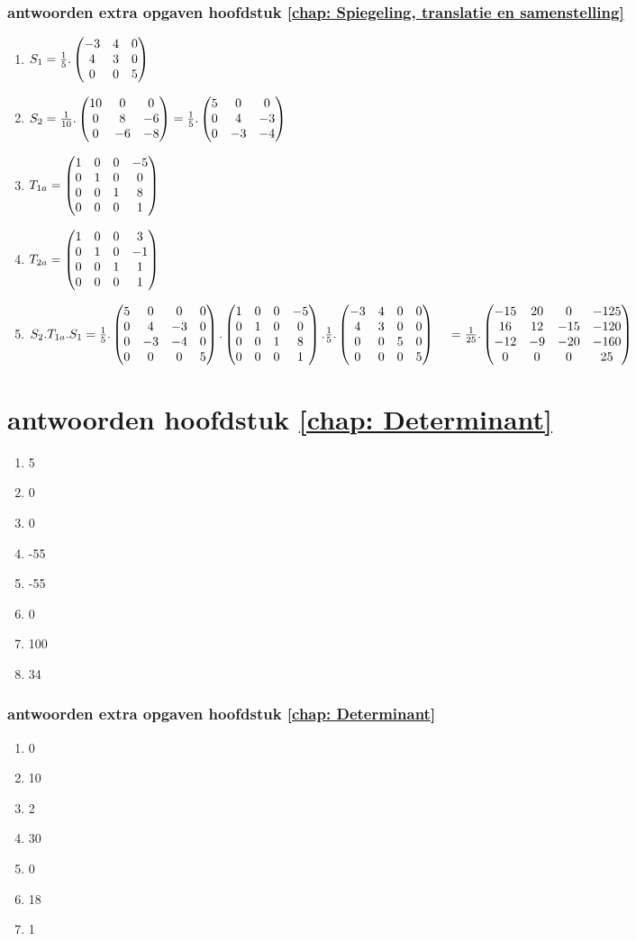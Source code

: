 \documentclass[hidelinks, a4wide, 12pt,  twoside]{book}
\begin{document}
\subsubsection{antwoorden extra opgaven hoofdstuk \ref{chap: Spiegeling, translatie en samenstelling}}
\begin{enumerate}
	\item $   S_1 = \frac{1}{5} .\begin{pmatrix} -3&4&0 \\ 4&3&0 \\ 0&0&5 \end{pmatrix}  $ 
	\item $   S_2 = \frac{1}{10} .\begin{pmatrix} 10&0&0 \\ 0&8&-6 \\ 0&-6&-8 \end{pmatrix}  
	= \frac{1}{5} .\begin{pmatrix} 5&0&0 \\ 0&4&-3 \\ 0&-3&-4 \end{pmatrix}  $ 
	
	\item $ T_{1a} = \begin{pmatrix} 1&0&0&-5 \\ 0&1&0&0 \\ 0&0&1&8 \\ 0&0&0&1 \end{pmatrix} $
	\item $ T_{2a} = \begin{pmatrix} 1&0&0&3 \\ 0&1&0&-1 \\ 0&0&1&1 \\ 0&0&0&1 \end{pmatrix} $
	\item $ S_2 . T_{1a} . S_1 = \frac{1}{5} .\begin{pmatrix} 5&0&0&0 \\ 0&4&-3&0 \\ 0&-3&-4&0 \\ 0&0&0&5 \end{pmatrix} . 
	\begin{pmatrix} 1&0&0&-5 \\ 0&1&0&0 \\ 0&0&1&8 \\ 0&0&0&1 \end{pmatrix} . 
	\frac{1}{5} .	\begin{pmatrix} -3&4&0&0 \\ 4&3&0&0 \\ 0&0&5&0 \\ 0&0&0&5 \end{pmatrix} \\
	\quad	= \frac{1}{25} .	\begin{pmatrix} -15&20&0&-125 \\ 16&12&-15&-120 \\ -12&-9&-20&-160 \\ 0&0&0&25 \end{pmatrix} 
	$
	
\end{enumerate}

\section{antwoorden  hoofdstuk \ref{chap: Determinant}}
\begin{enumerate}[label=\Alph*]
	\item 5
	\item 0
	\item 0
	\item -55
	\item -55
	\item 0
	\item 100
	\item 34
\end{enumerate}
\subsubsection{antwoorden extra opgaven hoofdstuk \ref{chap: Determinant}}
\begin{enumerate}[label=\Alph*]
	\item 0
	\item 10
	\item 2
	\item 30
	\item 0
	\item 18
	\item 1
\end{enumerate}
\end{document}
